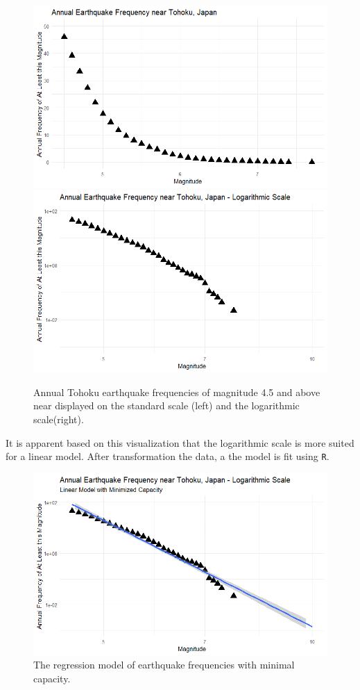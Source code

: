 \begin{figure}[H]
    \includegraphics[width=0.5\linewidth]{Figures/tohoku_standardscale.png}
    \includegraphics[width=0.5\linewidth]{Figures/tohoku_logscale.png}
    \caption{\footnotesize{Annual Tohoku earthquake frequencies of magnitude 4.5 and above near displayed on the standard scale (left) and the logarithmic scale(right).}}
    \label{tohoku_unfit}
\end{figure}

It is apparent based on this visualization that the logarithmic scale is more suited for a linear model.  After transformation the data, a the model is fit using
\texttt{R}.

\begin{figure}[H]
    \center
    \includegraphics[width=0.65\linewidth]{Figures/tohoku_logscale_fit.png}
    \caption{\footnotesize{The regression model of earthquake frequencies with minimal capacity.}}
    \label{tohoku_lm}
\end{figure}

